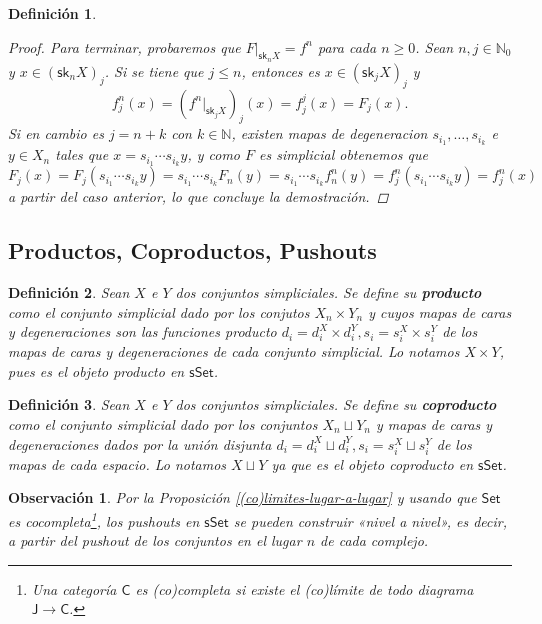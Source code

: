 \documentclass[11pt]{report}
\theoremstyle{colored}
\newtheorem{definition}{Definición}[section]
\newtheorem{remark}{Observación}[section]
\newcommand{\N}{\mathbb{N}}
\newcommand{\cat}[1]{\mathsf{#1}}
\newcommand{\sk}{\mathsf{sk}}
\newcommand{\guill}[1]{«#1»}
\begin{document}
\begin{definition}
\begin{proof}
Para terminar, probaremos que $F|_{\sk_nX} = f^n$ para cada $n \geq 0$. Sean $n,j \in \N_0$ y $x \in (\sk_nX)_j$. Si se tiene que $j \leq n$, entonces es $x \in (\sk_jX)_j$ y
\[
f^n_j(x) = (f^n|_{\sk_jX})_j(x) = f^j_j(x) = F_j(x).
\]
Si en cambio es $j = n + k$ con $k \in \N$, existen mapas de degeneracion $s_{i_1},\dots,s_{i_{k}}$ e $y \in X_n$ tales que $x = s_{i_1}\cdots s_{i_{k}}y$, y como $F$ es simplicial obtenemos que
\[
F_j(x) = F_j(s_{i_1}\cdots s_{i_{k}}y) = s_{i_1}\cdots s_{i_{k}}F_n(y) = s_{i_1}\cdots s_{i_{k}}f^n_n(y) = f^n_j(s_{i_1}\cdots s_{i_{k}}y) = f^n_j(x)
\]
a partir del caso anterior, lo que concluye la demostración.
\end{proof}

\end{definition}

\subsection{Productos, Coproductos, Pushouts}

\begin{definition} Sean $X$ e $Y$ dos conjuntos simpliciales. Se define su \textbf{producto} como el conjunto simplicial dado por los conjutos $X_n \times Y_n$ y cuyos mapas de caras y degeneraciones son las funciones producto $d_i = d_i^X \times d_i^Y, s_i = s_i^X \times s_i^Y$ de los mapas de caras y degeneraciones de cada conjunto simplicial. Lo notamos $X \times Y$, pues es el objeto producto en $\cat{sSet}$.
\end{definition}

\begin{definition} Sean $X$ e $Y$ dos conjuntos simpliciales. Se define su \textbf{coproducto} como el conjunto simplicial dado por los conjuntos $X_n \sqcup Y_n$ y mapas de caras y degeneraciones dados por la unión disjunta $d_i = d_i^X \sqcup d_i^Y, s_i = s_i^X \sqcup s_i^Y$ de los mapas de cada espacio. Lo notamos $X \sqcup Y$ ya que es el objeto coproducto en $\cat{sSet}$.
\end{definition}

\begin{remark} Por la Proposición \ref{(co)limites-lugar-a-lugar} y usando que $\cat{Set}$ es cocompleta\footnote{Una categoría $\cat{C}$ es (co)completa si existe el (co)límite de todo diagrama $\cat{J} \to \cat{C}$.}, los pushouts en $\cat{sSet}$ se pueden construir \guill{nivel a nivel}, es decir, a partir del pushout de los conjuntos en el lugar $n$ de cada complejo.
\end{remark}
\end{document}
